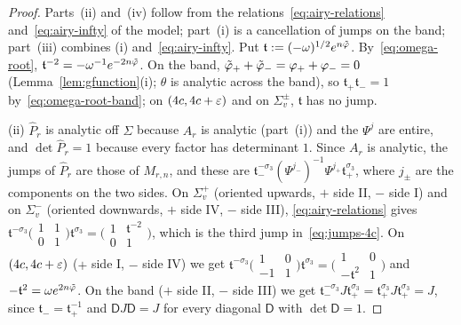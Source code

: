 \begin{proof}
Parts~(ii) and~(iv) follow from the relations~\eqref{eq:airy-relations} and~\eqref{eq:airy-infty} of the model;
part~(i) is a cancellation of jumps on the band; part~(iii) combines (i) and~\eqref{eq:airy-infty}. Put
$\mathfrak t:=(-\omega)^{1/2}e^{n\tilde\varphi}$. By~\eqref{eq:omega-root}, $\mathfrak t^{-2}=-\omega^{-1}e^{-2n\tilde\varphi}$. On the band,
$\tilde\varphi_++\tilde\varphi_-=\varphi_++\varphi_-=0$ (Lemma~\ref{lem:gfunction}(i); $\theta$ is analytic across the band), so
$\mathfrak t_+\mathfrak t_-=1$ by~\eqref{eq:omega-root-band}; on $(4c,4c+\varepsilon)$ and on $\Sigma_v^\pm$, $\mathfrak t$ has no jump.

(ii) $\hat P_r$ is analytic off $\Sigma$ because $A_r$ is analytic (part~(i)) and the $\Psi^j$ are entire, and
$\det\hat P_r=1$ because every factor has determinant $1$. Since $A_r$ is analytic, the jumps of $\hat P_r$ are those of
$M_{r,n}$, and these are $\mathfrak t_-^{-\sigma_3}(\Psi^{j_-})^{-1}\Psi^{j_+}\mathfrak t_+^{\sigma_3}$, where $j_\pm$ are the components on
the two sides. On $\Sigma_v^+$ (oriented upwards, $+$ side II, $-$ side I) and on $\Sigma_v^-$ (oriented downwards, $+$
side IV, $-$ side III), \eqref{eq:airy-relations} gives
$\mathfrak t^{-\sigma_3}\bigl(\begin{smallmatrix}1&1\\0&1\end{smallmatrix}\bigr)\mathfrak t^{\sigma_3}
=\bigl(\begin{smallmatrix}1&\mathfrak t^{-2}\\0&1\end{smallmatrix}\bigr)$, which is the third jump in~\eqref{eq:jumps-4c}. On
$(4c,4c+\varepsilon)$ ($+$ side I, $-$ side IV) we get
$\mathfrak t^{-\sigma_3}\bigl(\begin{smallmatrix}1&0\\-1&1\end{smallmatrix}\bigr)\mathfrak t^{\sigma_3}
=\bigl(\begin{smallmatrix}1&0\\-\mathfrak t^2&1\end{smallmatrix}\bigr)$ and $-\mathfrak t^2=\omega e^{2n\tilde\varphi}$. On the band ($+$ side II,
$-$ side III) we get $\mathfrak t_-^{-\sigma_3}J\mathfrak t_+^{\sigma_3}=\mathfrak t_+^{\sigma_3}J\mathfrak t_+^{\sigma_3}=J$, since $\mathfrak t_-=\mathfrak t_+^{-1}$ and $\mathsf DJ\mathsf D=J$
for every diagonal $\mathsf D$ with $\det \mathsf D=1$.


\end{proof}
